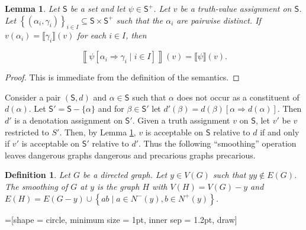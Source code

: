 \documentclass[12pt]{article}
\newtheorem{lem}[thm]{Lemma}
\newtheorem{defn}{Definition}
\theoremstyle{remark}
\def\S{\textsf{S}}
\begin{document}
\begin{lem}\label{SubstitutionLemma}
Let $\S$ be a set and let $\psi \in \S^+$.  Let $v$ be a truth-value assignment on $\S$.  Let $\left\{ (\alpha_i, \gamma_i)\right\}_{i \in I} \subseteq \S \times \S^+$ such that the $\alpha_i$ are pairwise distinct. If $v(\alpha_i) = \llbracket \gamma_i \rrbracket(v)$ for each $i \in I$, then

\[\left\llbracket \psi\left[\alpha_i \Rightarrow \gamma_i \mid i \in I\right]\right\rrbracket(v) = \llbracket \psi \rrbracket(v).\] 
\end{lem}
\begin{proof}
This is immediate from the definition of the semantics.
\end{proof}

Consider a pair $(\S, d)$ and $\alpha \in \S$ such that $\alpha$ does not occur as a constituent of $d(\alpha)$. Let $\S' = \S - \{\alpha\}$ and for $\beta \in \S'$ let $d'(\beta) = d(\beta)\left[\alpha \Rightarrow d(\alpha)\right]$.  Then $d'$ is a denotation assignment on $\S'$. Given a truth assignment $v$ on $\S$, let $v'$ be $v$ restricted to $S'$.  Then, by Lemma \ref{SubstitutionLemma}, $v$ is acceptable on $\S$ relative to $d$ if and only if $v'$ is acceptable on $\S'$ relative to $d'$.  Thus the following ``smoothing'' operation leaves dangerous graphs dangerous and precarious graphs precarious.

\begin{defn}
Let $G$ be a directed graph.  Let $y \in V(G)$ such that $yy \not \in E(G)$.  The \emph{smoothing} of $G$ at $y$ is the graph $H$ with $V(H) = V(G) - y$ and
$E(H) = E(G - y) \cup \left\{ab \mid a \in N^-(y), b \in N^+(y)\right\}$.
\end{defn}

=[shape = circle,	
  								 minimum size = 1pt,
								 inner sep = 1.2pt,
								 draw]
\end{document}
